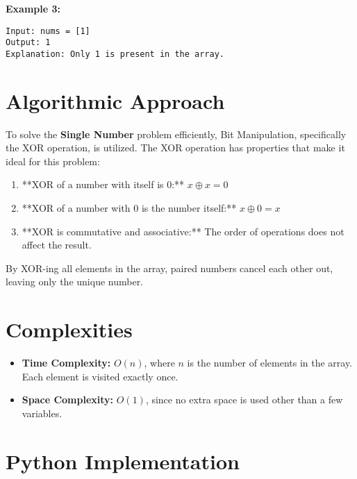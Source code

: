 \textbf{Example 3:}

\begin{verbatim}
Input: nums = [1]
Output: 1
Explanation: Only 1 is present in the array.
\end{verbatim}



\section*{Algorithmic Approach}

To solve the \textbf{Single Number} problem efficiently, Bit Manipulation, specifically the XOR operation, is utilized. The XOR operation has properties that make it ideal for this problem:

\begin{enumerate}
    \item **XOR of a number with itself is 0:** \(x \oplus x = 0\)
    \item **XOR of a number with 0 is the number itself:** \(x \oplus 0 = x\)
    \item **XOR is commutative and associative:** The order of operations does not affect the result.
\end{enumerate}

By XOR-ing all elements in the array, paired numbers cancel each other out, leaving only the unique number.


\section*{Complexities}

\begin{itemize}
    \item \textbf{Time Complexity:} \(O(n)\), where \(n\) is the number of elements in the array. Each element is visited exactly once.
    
    \item \textbf{Space Complexity:} \(O(1)\), since no extra space is used other than a few variables.
\end{itemize}

\section*{Python Implementation}

